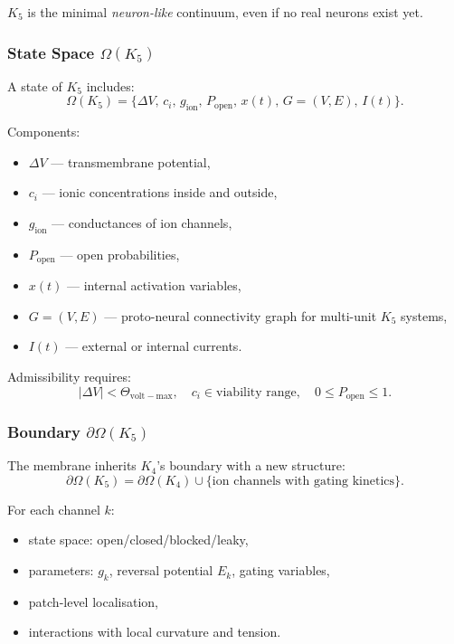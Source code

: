 $K_5$ is the minimal \emph{neuron-like} continuum, even if no real
neurons exist yet.

\subsubsection{State Space \texorpdfstring{$\Omega(K_5)$}{\Omega(K_5)}}

A state of $K_5$ includes:
\[
\Omega(K_5) = \{ \Delta V,\, c_i,\, g_{\mathrm{ion}},\,
                P_{\mathrm{open}},\,
                x(t),\,
                G=(V,E),\,
                I(t) \}.
\]

Components:
\begin{itemize}
    \item $\Delta V$ — transmembrane potential,
    \item $c_i$ — ionic concentrations inside and outside,
    \item $g_{\mathrm{ion}}$ — conductances of ion channels,
    \item $P_{\mathrm{open}}$ — open probabilities,
    \item $x(t)$ — internal activation variables,
    \item $G=(V,E)$ — proto-neural connectivity graph for multi-unit
          $K_5$ systems,
    \item $I(t)$ — external or internal currents.
\end{itemize}

Admissibility requires:
\[
|\Delta V| < \Theta_{\mathrm{volt-max}}, \quad
c_i \in \text{viability range}, \quad
0 \le P_{\mathrm{open}} \le 1.
\]

\subsubsection{Boundary \texorpdfstring{$\partial\Omega(K_5)$}{\partial\Omega(K_5)}}

The membrane inherits $K_4$'s boundary with a new structure:
\[
\partial\Omega(K_5)
    = \partial\Omega(K_4)
      \cup \{ \text{ion channels with gating kinetics} \}.
\]

For each channel $k$:
\begin{itemize}
    \item state space: open/closed/blocked/leaky,
    \item parameters: $g_k$, reversal potential $E_k$, gating variables,
    \item patch-level localisation,
    \item interactions with local curvature and tension.
\end{itemize}

